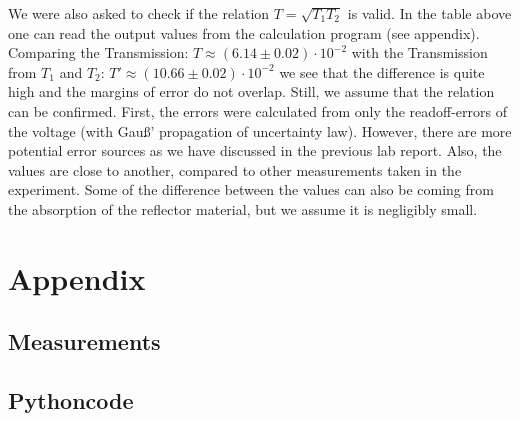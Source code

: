 \documentclass{article}
\begin{document}
We were also asked to check if the relation $T = \sqrt{T_{1}T_{2}}$ is valid. In the table above one can read the output values from the calculation program (see appendix). Comparing the Transmission: $T \approx (6.14 \pm 0.02) \cdot 10^{-2}$ with the Transmission from $T_{1}$ and $T_{2}$: $T' \approx (10.66 \pm 0.02) \cdot 10^{-2}$ we see that the difference is quite high and the margins of error do not overlap. Still, we assume that the relation can be confirmed. First, the errors were calculated from only the readoff-errors of the voltage (with Gauß' propagation of uncertainty law). However, there are more potential error sources as we have discussed in the previous lab report. Also, the values are close to another, compared to other measurements taken in the experiment. Some of the difference between the values can also be coming from the absorption of the reflector material, but we assume it is negligibly small.

\section{Appendix}

\subsection{Measurements}




\subsection{Pythoncode}

\end{document}
